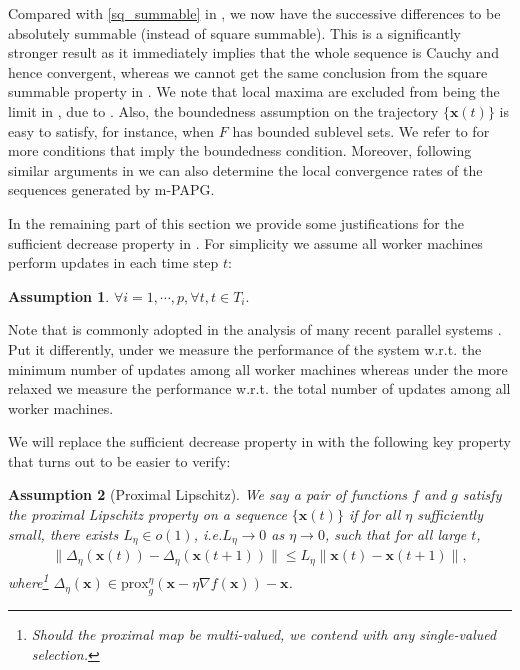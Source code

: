 \documentclass[leqno,onefignum,onetabnum]{siamart0516}
\newtheorem{assum}{Assumption}
\newcommand{\ie}{{i.e.}\xspace}
\newcommand{\wrt}{{w.r.t.}\xspace}
\newcommand{\xb}{\mathbf{x}}
\newcommand{\prox}[2][\eta]{\mathrm{prox}_{#2}^{#1}}
\newcommand{\mspg}{\textsf{m-PAPG}\xspace}
\begin{document}
Compared with \eqref{sq_summable}  in , we now have the successive differences to be absolutely summable (instead of square summable). This is a significantly stronger result as it immediately implies that the whole sequence is Cauchy and hence convergent, whereas we cannot get the same conclusion from the square summable property in .
We note that local maxima are excluded from being the limit in , due to . Also, the boundedness assumption on the trajectory $\{\xb(t)\}$ is easy to satisfy, for instance, when $F$ has bounded sublevel sets. We refer to \cite[Remark 3.3]{KL_bound_sequence} for more  conditions that imply the boundedness condition. Moreover, following similar arguments in \cite{KL_bound_sequence} we can also determine the local convergence rates of the sequences generated by \mspg.

In the remaining part of this section we provide some justifications for the sufficient decrease property in .  For simplicity we assume all worker machines perform updates in each time step $t$: 
\begin{assum}\label{assum:always}
	$\forall i = 1, \cdots, p, \forall t, t \in T_i.$
\end{assum}
Note that  is commonly adopted in the analysis of many recent parallel systems \cite{distrib_delay,delay_pga_linear,ssp_parameter,parameter_server,asy_coord_prox,hogwild}. Put it differently, under  we measure the performance of the system \wrt the minimum number of updates among all worker machines whereas  under the more relaxed   we measure the performance \wrt the total number of updates among all worker machines.

We will replace the sufficient decrease property in  with the following key property that turns out to be easier to verify:
\begin{assum}[Proximal Lipschitz]\label{assum:EL}
	We say a pair of functions $f$ and $g$ satisfy the proximal Lipschitz property on a sequence $\{\xb(t)\}$ if for all $\eta$ sufficiently small, there exists $L_\eta \in o(1)$, \ie $L_\eta \to 0$ as $\eta \to 0$, such that for all large $t$,
	\begin{align}
	\| \Delta_\eta(\xb(t)) - \Delta_\eta(\xb(t+1)) \| \le L_\eta \|\xb(t) - \xb(t+1)\|,
	\end{align}
	where\footnote{Should the proximal map be multi-valued, we contend with any single-valued selection.}
	$\Delta_\eta(\xb) \in \prox{g}(\xb - \eta\nabla f(\xb)) - \xb$.%
\end{assum}
\end{document}
